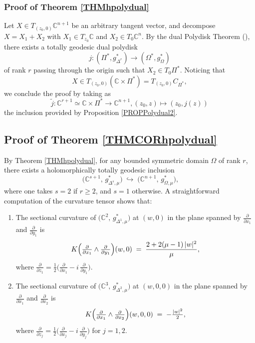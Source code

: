 \documentclass[reqno, 11pt]{amsart}
\newcommand{\C}{\mathbb{C}}
\newcommand{\W}{\Omega}
\begin{document}
\subsubsection*{Proof of Theorem \ref{THMhpolydual}}
Let \(X\in T_{(z_0,0)}\C^{n+1}\) be an arbitrary tangent vector, and decompose \(X=X_1+X_2\) with \(X_1\in T_{z_0}\C\) and \(X_2\in T_0\C^n\).  
By the dual  Polydisk Theorem (\cite{WolfBook1969FineStructureHSSpolydisc}), there exists a totally geodesic  dual polydisk
$$
j\colon (\Pi^*, g^*_{\Delta^r}) \rightarrow (\Omega^*, g^*_{\Omega})
$$
of rank $r$ passing through the origin such that \(X_2\in T_0\Pi^*\).
Noticing that
\[
X\in T_{(z_0,0)}(\C\times\Pi^*) = T_{(z_0,0)}C_{\Pi^*},
\]
we conclude the proof by taking as 
$$\widetilde{j}:\C^{r+1}\simeq \C\times\Pi^*\rightarrow \C^{n+1}, (z_0, z)\mapsto (z_0, j(z))$$
the inclusion provided by Proposition \ref{PROPPolydual2}. 



  
  


\subsection{Proof of Theorem \ref{THMCORhpolydual}}

By Theorem \ref{THMhpolydual}, for any bounded symmetric domain \(\W\) of rank \(r\), there exists a holomorphically totally geodesic inclusion
\[
\; \bigl(\C^{s+1},\,g^*_{\Delta^s,\mu}\bigr)\;\hookrightarrow\;\bigl(\C^{n+1},\,g^*_{\W,\mu}\bigr),
\]
where one takes \(s=2\) if \(r\ge2\), and \(s=1\) otherwise.  A straightforward computation of the curvature tensor shows that:
\begin{enumerate}
  \item The sectional curvature of $\bigl(\C^{2},\,g^*_{\Delta^1,\mu}\bigr)$ at \((w, 0)\) in the plane spanned by \(\frac{\partial}{\partial x_1}\) and \(\frac{\partial}{\partial y_1}\) is
  \begin{equation}\label{EQnocptmuneq1}
    K\Bigl(\tfrac{\partial}{\partial x_1}\wedge \tfrac{\partial}{\partial y_1}\Bigr)(w, 0)
    \;=\;
    \frac{2 + 2(\mu-1)\,\lvert w\rvert^2}{\mu},
  \end{equation}
  where \(\frac{\partial}{\partial z_1}=\tfrac12\bigl(\tfrac{\partial}{\partial x_1}-i\,\tfrac{\partial}{\partial y_1}\bigr)\).
  
  \item The sectional curvature of $\bigl(\C^{3},\,g^*_{\Delta^2,\mu}\bigr)$ at \((w, 0,0)\) in the plane spanned by \(\frac{\partial}{\partial x_1}\) and \(\frac{\partial}{\partial x_2}\) is
  \begin{equation}\label{EQnocptmuneq2}
    K\Bigl(\tfrac{\partial}{\partial x_1}\wedge \tfrac{\partial}{\partial x_2}\Bigr)(w, 0,0)
    \;=\;
    -\tfrac{\lvert w\rvert^2}{2},
  \end{equation}
  where \(\frac{\partial}{\partial z_j}=\tfrac12\bigl(\tfrac{\partial}{\partial x_j}-i\,\tfrac{\partial}{\partial y_j}\bigr)\) for \(j=1,2\).
\end{enumerate}
\end{document}
